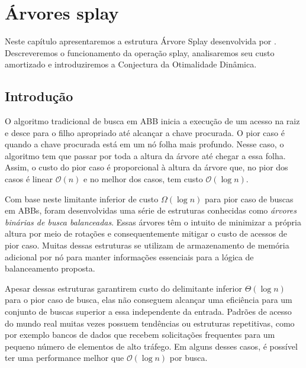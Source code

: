 
\chapter{Árvores splay}
\label{cap:arvores-splay}

\newtheorem{caso}{Caso}

Neste capítulo apresentaremos a estrutura Árvore Splay desenvolvida por \cite{selfadjustingbst}. Descreveremos o funcionamento da operação splay, analisaremos seu custo amortizado e introduziremos a Conjectura da Otimalidade Dinâmica.  


\section{Introdução}
O algoritmo tradicional de busca em ABB inicia a execução de um acesso na raiz e desce para o filho apropriado até alcançar a chave procurada. O pior caso é quando a chave procurada está em um nó folha mais profundo. Nesse caso, o algoritmo tem que passar por toda a altura da árvore até chegar a essa folha. Assim, o custo do pior caso é proporcional à altura da árvore que, no pior dos casos é linear $\mathcal{O}(n)$ e no melhor dos casos, tem custo $\mathcal{O}(\log{}n)$.

Com base neste limitante inferior de custo $\Omega(\log{}n)$ para pior caso de buscas em ABBs, foram desenvolvidas uma série de estruturas conhecidas como \textit{árvores binárias de busca balanceadas}. Essas árvores têm o intuito de minimizar a própria altura por meio de rotações e consequentemente mitigar o custo de acessos de pior caso. Muitas dessas estruturas se utilizam de armazenamento de memória adicional por nó para manter informações essenciais para a lógica de balanceamento proposta. 

Apesar dessas estruturas garantirem custo do delimitante inferior $\Theta(\log{}n)$ para o pior caso de busca, elas não conseguem alcançar uma eficiência para um conjunto de buscas superior a essa independente da entrada. Padrões de acesso do mundo real muitas vezes possuem tendências ou estruturas repetitivas, como por exemplo bancos de dados que recebem solicitações frequentes para um pequeno número de elementos de alto tráfego. Em alguns desses casos, é possível ter uma performance melhor que $\mathcal{O}(\log{}n)$ por busca.

